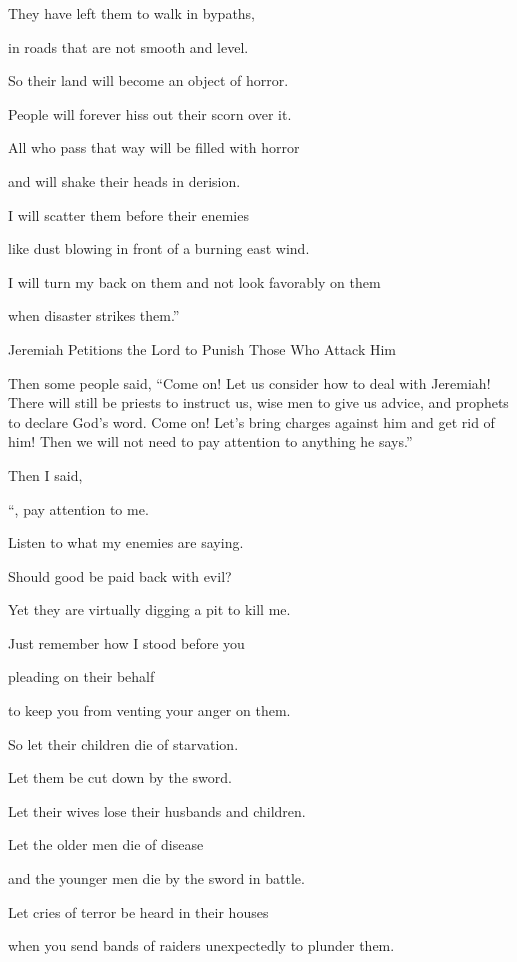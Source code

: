 {\par }{\Q They have left them to walk
in bypaths,
\par }{\Q in roads
that are not
smooth and level.
\par }{\Q {}So their land
will become
an object of horror.
\par }{\Q People will forever
hiss out
their scorn over
it.
\par }{\Q All
who pass
that way will be filled with horror
\par }{\Q and will shake
their heads in derision.
\par }{\Q {}I will scatter
them before
their enemies
\par }{\Q like dust blowing
in front
of a
burning east
wind.
\par }{\Q I will turn my back on them and not
look
favorably on them

\par }{\Q when
disaster strikes them.”
\par }{\SH Jeremiah Petitions the Lord to Punish Those Who Attack Him
\par }{\PP {}Then some people said,
“Come
on! Let us consider
how to deal
with Jeremiah! There will still be priests
to instruct us, wise men
to give us advice,
and prophets
to declare God’s word.
Come on! Let’s bring charges against him and get rid of
him! Then we will not
need to pay attention
to
anything
he says.”
\par }{\PP {}Then I said,

\par }{\Q “{}, pay attention
to
me.
\par }{\Q Listen
to what my enemies
are saying.
\par }{\Q {}Should
good
be paid
back with evil?
\par }{\Q Yet
they are
virtually
digging a pit
to kill
me.

\par }{\Q Just remember
how I stood
before
you
\par }{\Q pleading
on
their behalf
\par }{\Q to keep you from venting
your anger
on them.
\par }{\Q {}So
let
their children
die of starvation.
\par }{\Q Let them be cut down
by
the sword.
\par }{\Q Let
their wives
lose
their husbands
and children.
\par }{\Q Let the older men
die
of disease
\par }{\Q and the younger men
die
by the sword
in battle.
\par }{\Q {}Let cries
of terror be heard
in their houses
\par }{\Q when
you send
bands of raiders
unexpectedly
to plunder them.

}
